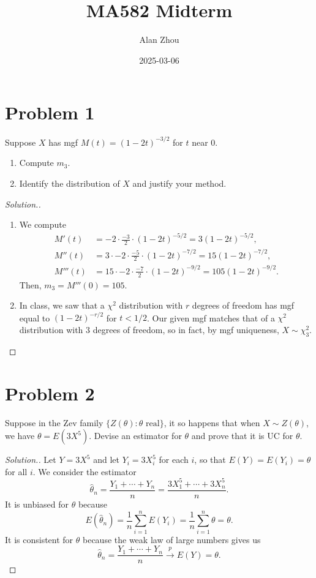 \documentclass{article}
\title{MA582 Midterm}
\author{Alan Zhou}
\date{2025-03-06}
\begin{document}
\maketitle


\section*{Problem 1}
Suppose $X$ has mgf $M(t) = (1 - 2t)^{-3/2}$ for $t$ near $0$.
\begin{enumerate}[label=(\alph*)]
\item Compute $m_3$.
\item Identify the distribution of $X$ and justify your method.
\end{enumerate}

\begin{proof}[Solution.] 
\begin{enumerate}[label=(\alph*)]
\item We compute
\begin{align*}
M'(t) &= -2\cdot\frac{-3}{2}\cdot (1 - 2t)^{-5/2} = 3(1 - 2t)^{-5/2}, \\
M''(t) &= 3\cdot -2\cdot\frac{-5}{2}\cdot (1 - 2t)^{-7/2} = 15(1 - 2t)^{-7/2}, \\
M'''(t) &= 15\cdot -2\cdot\frac{-7}{2}\cdot (1 - 2t)^{-9/2} = 105(1 - 2t)^{-9/2}.
\end{align*}
Then, $m_3 = M'''(0) = \boxed{105}$.
\item In class, we saw that a $\chi^2$ distribution with $r$ degrees of freedom has mgf equal to $(1 - 2t)^{-r/2}$ for $t < 1/2$. Our given mgf matches that of a $\chi^2$ distribution with $3$ degrees of freedom, so in fact, by mgf uniqueness, $X\sim\boxed{\chi_3^2}$.
\end{enumerate}
\end{proof}


\newpage
\section*{Problem 2}
Suppose in the Zev family $\{Z(\theta):\theta\text{ real}\}$, it so happens that when $X\sim Z(\theta)$, we have $\theta = E(3X^5)$. Devise an estimator for $\theta$ and prove that it is UC for $\theta$.

\begin{proof}[Solution.]
Let $Y = 3X^5$ and let $Y_i = 3X_i^5$ for each $i$, so that $E(Y) = E(Y_i) = \theta$ for all $i$. We consider the estimator
\begin{equation*}
\hat{\theta}_n = \frac{Y_1 + \cdots + Y_n}{n} = \boxed{\frac{3X_1^5 + \cdots + 3X_n^5}{n}}.
\end{equation*}
It is unbiased for $\theta$ because
\begin{equation*}
E(\hat{\theta}_n) = \frac{1}{n}\sum_{i = 1}^n E(Y_i) = \frac{1}{n}\sum_{i = 1}^n\theta = \theta.
\end{equation*}
It is consistent for $\theta$ because the weak law of large numbers gives us
\begin{equation*}
\hat{\theta}_n = \frac{Y_1 + \cdots + Y_n}{n}\stackrel{p}{\longrightarrow} E(Y) = \theta.
\end{equation*}
\end{proof}
\end{document}

